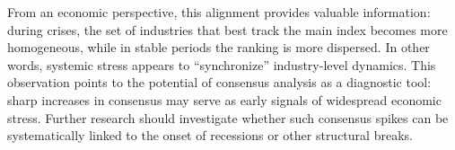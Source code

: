 From an economic perspective, this alignment provides valuable information: during crises, the set of industries that best track the main index becomes more homogeneous, while in stable periods the ranking is more dispersed. In other words, systemic stress appears to “synchronize” industry-level dynamics. This observation points to the potential of consensus analysis as a diagnostic tool: sharp increases in consensus may serve as early signals of widespread economic stress. Further research should investigate whether such consensus spikes can be systematically linked to the onset of recessions or other structural breaks.

